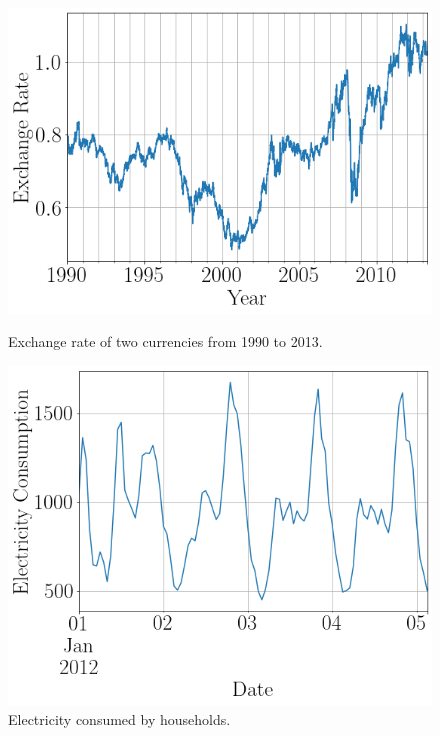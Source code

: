 \begin{figure}[htb]
    \centering
    \includegraphics[width=\linewidth]{./img/exchange_rate_zoomed_2.png}
    \caption{Exchange rate of two currencies from 1990 to 2013.}
    \label{fig:example_timeseries}
    \endminipage\hfill
    \includegraphics[width=\linewidth]{./img/electricity_zoomed_3.png}
    \caption{Electricity consumed by households.}
    \label{fig:example_timeseries_electricity}
    \endminipage\hfill
\end{figure}

